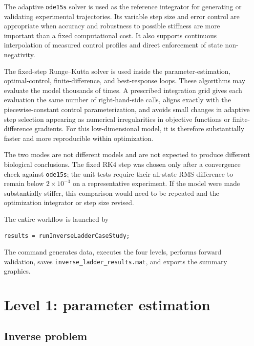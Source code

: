 \documentclass[11pt,a4paper]{article}
\begin{document}
The adaptive \texttt{ode15s} solver is used as the reference integrator for
generating or validating experimental trajectories. Its variable step size
and error control are appropriate when accuracy and robustness to possible
stiffness are more important than a fixed computational cost. It also supports
continuous interpolation of measured control profiles and direct enforcement
of state non-negativity.

The fixed-step Runge--Kutta solver is used inside the parameter-estimation,
optimal-control, finite-difference, and best-response loops. These algorithms
may evaluate the model thousands of times. A prescribed integration grid gives
each evaluation the same number of right-hand-side calls, aligns exactly with
the piecewise-constant control parameterization, and avoids small changes in
adaptive step selection appearing as numerical irregularities in objective
functions or finite-difference gradients. For this low-dimensional model, it
is therefore substantially faster and more reproducible within optimization.

The two modes are not different models and are not expected to produce
different biological conclusions. The fixed RK4 step was chosen only after a
convergence check against \texttt{ode15s}; the unit tests require their
all-state RMS difference to remain below \(2\times10^{-3}\) on a representative
experiment. If the model were made substantially stiffer, this comparison
would need to be repeated and the optimization integrator or step size revised.

The entire workflow is launched by
\begin{lstlisting}[style=matlabstyle]
results = runInverseLadderCaseStudy;
\end{lstlisting}
The command generates data, executes the four levels, performs forward
validation, saves \texttt{inverse\_ladder\_results.mat}, and exports the
summary graphics.

\section{Level 1: parameter estimation}

\subsection{Inverse problem}
\end{document}
